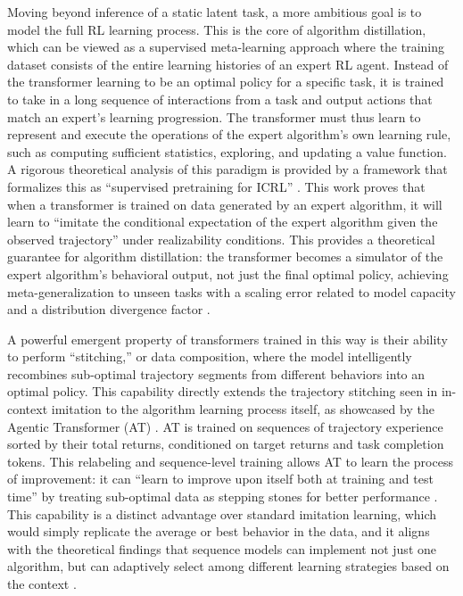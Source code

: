 \documentclass[11pt]{article}
\begin{document}
Moving beyond inference of a static latent task, a more ambitious goal is to model the full RL learning process. This is the core of algorithm distillation, which can be viewed as a supervised meta-learning approach where the training dataset consists of the entire learning histories of an expert RL agent. Instead of the transformer learning to be an optimal policy for a specific task, it is trained to take in a long sequence of interactions from a task and output actions that match an expert's learning progression. The transformer must thus learn to represent and execute the operations of the expert algorithm's own learning rule, such as computing sufficient statistics, exploring, and updating a value function. A rigorous theoretical analysis of this paradigm is provided by a framework that formalizes this as ``supervised pretraining for ICRL'' \cite{ref366}. This work proves that when a transformer is trained on data generated by an expert algorithm, it will learn to ``imitate the conditional expectation of the expert algorithm given the observed trajectory'' under realizability conditions. This provides a theoretical guarantee for algorithm distillation: the transformer becomes a simulator of the expert algorithm's behavioral output, not just the final optimal policy, achieving meta-generalization to unseen tasks with a scaling error related to model capacity and a distribution divergence factor \cite{ref366}.

A powerful emergent property of transformers trained in this way is their ability to perform ``stitching,'' or data composition, where the model intelligently recombines sub-optimal trajectory segments from different behaviors into an optimal policy. This capability directly extends the trajectory stitching seen in in-context imitation to the algorithm learning process itself, as showcased by the Agentic Transformer (AT) \cite{ref367}. AT is trained on sequences of trajectory experience sorted by their total returns, conditioned on target returns and task completion tokens. This relabeling and sequence-level training allows AT to learn the process of improvement: it can ``learn to improve upon itself both at training and test time'' by treating sub-optimal data as stepping stones for better performance \cite{ref367}. This capability is a distinct advantage over standard imitation learning, which would simply replicate the average or best behavior in the data, and it aligns with the theoretical findings that sequence models can implement not just one algorithm, but can adaptively select among different learning strategies based on the context \cite{ref110}.
\end{document}

